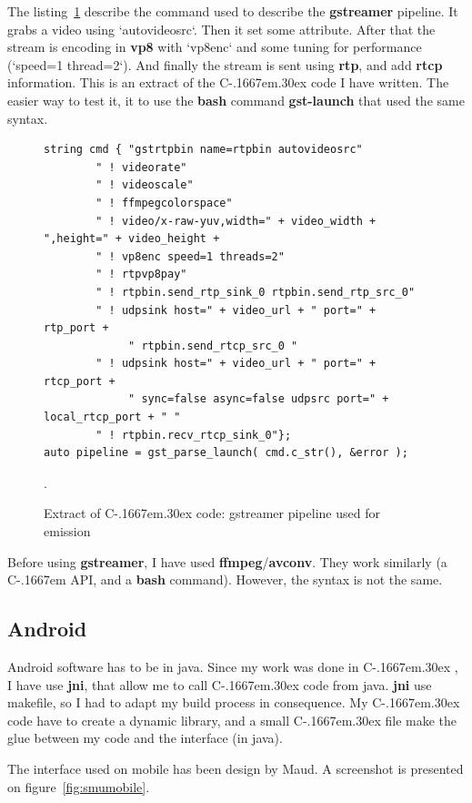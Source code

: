 \documentclass[a4paper,11pt]{custom}
\newcommand{\rtp}{\textbf{rtp}\xspace}
\newcommand{\rtcp}{\textbf{rtcp}\xspace}
\newcommand{\avconv}{\textbf{avconv}\xspace}
\newcommand{\ffmpeg}{\textbf{ffmpeg}\xspace}
\newcommand{\gstreamer}{\textbf{gstreamer}\xspace}
\newcommand{\vpx}{\textbf{vp8}\xspace}
\newcommand{\jni}{\textbf{jni}\xspace}
\newcommand{\bash}{\textbf{bash}\xspace}
\newcommand{\command}[1]{\textbf{#1}\xspace}
\newcommand{\cpp}{%
  C\kern-.1667em\raise.30ex\hbox{\smaller{++}}%
  \spacefactor1000\xspace%
}
\newcommand{\clang}{%
  C\kern-.1667em%
  \xspace%
}
\begin{document}
The listing~\ref{fig:exctractcppcode} describe the command used to describe the
\gstreamer pipeline. It grabs a video using `autovideosrc`. Then it set some
attribute. After that the stream is encoding in \vpx with `vp8enc` and some
tuning for performance (`speed=1 thread=2`). And finally the stream is sent
using \rtp, and add \rtcp information. This is an extract of the \cpp code
I have written. The easier way to test it, it to use the \bash command
\command{gst-launch} that used the same syntax.

\begin{figure}
\begin{lstlisting}
string cmd { "gstrtpbin name=rtpbin autovideosrc"
        " ! videorate"
        " ! videoscale"
        " ! ffmpegcolorspace"
        " ! video/x-raw-yuv,width=" + video_width + ",height=" + video_height +
        " ! vp8enc speed=1 threads=2"
        " ! rtpvp8pay"
        " ! rtpbin.send_rtp_sink_0 rtpbin.send_rtp_src_0"
        " ! udpsink host=" + video_url + " port=" + rtp_port +
             " rtpbin.send_rtcp_src_0 "
        " ! udpsink host=" + video_url + " port=" + rtcp_port +
             " sync=false async=false udpsrc port=" + local_rtcp_port + " "
        " ! rtpbin.recv_rtcp_sink_0"};
auto pipeline = gst_parse_launch( cmd.c_str(), &error );
\end{lstlisting}
\label{fig:exctractcppcode}
\caption{Extract of \cpp code: gstreamer pipeline used for emission}.
\end{figure}

Before using \gstreamer, I have used \ffmpeg/\avconv. They work similarly (a
\clang API, and a \bash command). However, the syntax is not the same.

\subsection{Android}

Android software has to be in java. Since my work was done in \cpp, I have use
\jni, that allow me to call \cpp code from java. \jni use makefile, so I had to
adapt my build process in consequence. My \cpp code have to create a dynamic
library, and a small \cpp file make the glue between my code and the interface
(in java).

The interface used on mobile has been design by Maud. A screenshot is presented
on figure~\ref{fig:smumobile}.
\end{document}
